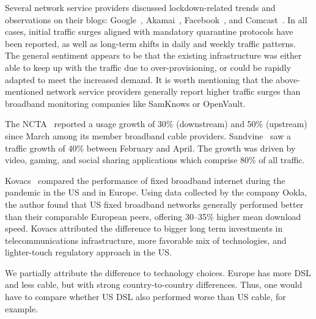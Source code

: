 \documentclass[conference,10pt]{IEEEtran}
\begin{document}
Several network service providers discussed lockdown-related trends and observations on their blogs: Google~\cite{google}, Akamai~\cite{akamai}, Facebook~\cite{facebook}, and Comcast~\cite{comcast}. In all cases, initial traffic surges aligned with mandatory quarantine protocols have been reported, as well as long-term shifts in daily and weekly traffic patterns. The general sentiment appears to be that the existing infrastructure was either able to keep up with the traffic due to over-provisioning, or could be rapidly adapted to meet the increased demand. It is worth mentioning that the above-mentioned network service providers generally report higher traffic surges than broadband monitoring companies like SamKnows or OpenVault.

The \gls{NCTA}~\cite{ncta} reported a usage growth of 30\% (downstream) and 50\% (upstream) since March among its member broadband cable providers. Sandvine~\cite{sandvine} saw a traffic growth of 40\% between February and April. The growth was driven by video, gaming, and social sharing applications which comprise 80\% of all traffic.

Kovacs~\cite{kovacs} compared the performance of fixed broadband internet during the pandemic in the \gls{US} and in Europe. Using data collected by the company Ookla, the author found that \gls{US} fixed broadband networks generally performed better than their comparable European peers, offering 30--35\% higher mean download speed. Kovacs attributed the difference to bigger long term investments in telecommunications infrastructure, more favorable mix of technologies, and lighter-touch regulatory approach in the \gls{US}.

We partially attribute the difference to technology choices. Europe has more \gls{DSL} and less cable, but with strong country-to-country differences. Thus, one would have to compare whether \gls{US} \gls{DSL} also performed worse than \gls{US} cable, for example.

\end{document}
